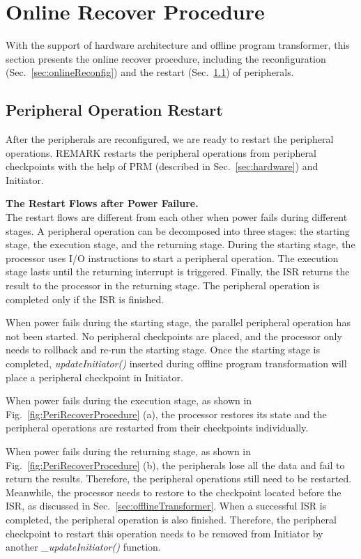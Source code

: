 \section{Online Recover Procedure} \label{sec:online}
%
With the support of hardware architecture and offline program transformer, this section presents the online recover procedure, including the reconfiguration (Sec.~\ref{sec:onlineReconfig}) and the restart (Sec.~\ref{sec:onlineRestart}) of peripherals.






\subsection{Peripheral Operation Restart} \label{sec:onlineRestart}
%
After the peripherals are reconfigured, we are ready to restart the peripheral operations.
REMARK restarts the peripheral operations from peripheral checkpoints with the help of PRM (described in Sec.~\ref{sec:hardware}) and Initiator.



\noindent\textbf{The Restart Flows after Power Failure.} \\
The restart flows are different from each other when power fails during different stages.
A peripheral operation can be decomposed into three stages: the starting stage, the execution stage, and the returning stage.
During the starting stage, the processor uses I/O instructions to start a peripheral operation.
The execution stage lasts until the returning interrupt is triggered.
Finally, the ISR returns the result to the processor in the returning stage.
The peripheral operation is completed only if the ISR is finished.

%
When power fails during the starting stage, the parallel peripheral operation has not been started.
No peripheral checkpoints are placed, and the processor only needs to rollback and re-run the starting stage.
Once the starting stage is completed, \emph{updateInitiator()} inserted during offline program transformation will place a peripheral checkpoint in Initiator.

When power fails during the execution stage, as shown in Fig.~\ref{fig:PeriRecoverProcedure} (a), the processor restores its state and the peripheral operations are restarted from their checkpoints individually.

When power fails during the returning stage, as shown in Fig.~\ref{fig:PeriRecoverProcedure} (b), the peripherals lose all the data and fail to return the results.
Therefore, the peripheral operations still need to be restarted.
Meanwhile, the processor needs to restore to the checkpoint located before the ISR, as discussed in Sec.~\ref{sec:offlineTransformer}.
When a successful ISR is completed, the peripheral operation is also finished.
Therefore, the peripheral checkpoint to restart this operation needs to be removed from Initiator by another \emph{\_updateInitiator()} function.

